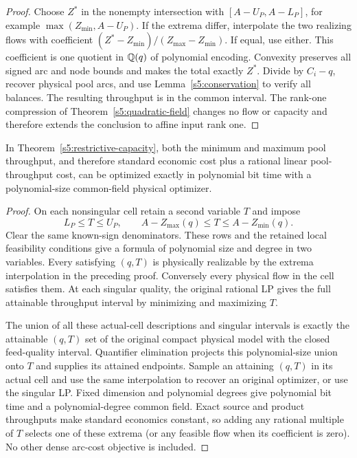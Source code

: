 \begin{proof}
Choose $Z^*$ in the nonempty intersection with $[A-U_P,A-L_P]$, for
example $\max(Z_{\min},A-U_P)$. If the extrema differ, interpolate the
two realizing flows with coefficient
$(Z^*-Z_{\min})/(Z_{\max}-Z_{\min})$. If equal, use either. This
coefficient is one quotient in $\mathbb Q(q)$ of polynomial encoding.
Convexity preserves all signed arc and node bounds and makes the total
exactly $Z^*$. Divide by $C_i-q$, recover physical pool arcs, and use
Lemma~\ref{s5:conservation} to verify all balances. The resulting
throughput is in the common interval. The rank-one compression of
Theorem~\ref{s5:quadratic-field} changes no flow or capacity and therefore
extends the conclusion to affine input rank one.
\end{proof}

\begin{corollary}
\label{s5:throughput-optimization}
In Theorem~\ref{s5:restrictive-capacity}, both the minimum and maximum
pool throughput, and therefore standard economic cost plus a rational
linear pool-throughput cost, can be optimized exactly in polynomial bit
time with a polynomial-size common-field physical optimizer.
\end{corollary}
\begin{proof}
On each nonsingular cell retain a second variable $T$ and impose
\[
 L_P\le T\le U_P,\qquad
 A-Z_{\max}(q)\le T\le A-Z_{\min}(q).
\]
Clear the same known-sign denominators. These rows and the retained
local feasibility conditions give a formula of polynomial size and
degree in two variables. Every satisfying $(q,T)$ is physically
realizable by the extrema interpolation in the preceding proof.
Conversely every physical flow in the cell satisfies them. At each
singular quality, the original rational LP gives the full attainable
throughput interval by minimizing and maximizing $T$.

The union of all these actual-cell descriptions and singular intervals
is exactly the attainable $(q,T)$ set of the original compact physical
model with the closed feed-quality interval. Quantifier elimination
projects this polynomial-size union onto $T$ and supplies its attained
endpoints. Sample an attaining $(q,T)$ in its actual cell and use the
same interpolation to recover an original optimizer, or use the
singular LP. Fixed dimension and polynomial degrees give polynomial bit
time and a polynomial-degree common field. Exact source and product
throughputs make standard economics constant, so adding any rational
multiple of $T$ selects one of these extrema (or any feasible flow when
its coefficient is zero). No other dense arc-cost objective is included.
\end{proof}

